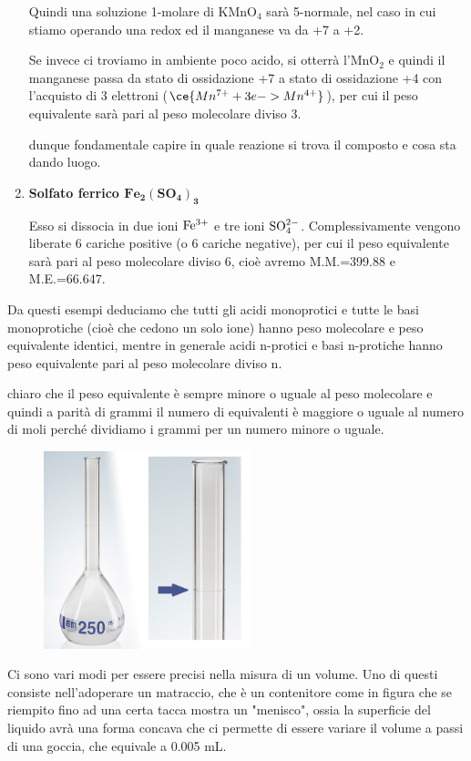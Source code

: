 \begin{enumerate}
    Quindi una soluzione 1-molare di KMnO$_4$ sarà 5-normale, nel caso in cui stiamo operando una redox ed il manganese va da +7 a +2. 
    
    \vspace{0.2cm}Se invece ci troviamo in ambiente poco acido, si otterrà l'MnO$_2$ e quindi il manganese passa da stato di ossidazione +7 a stato di ossidazione +4 con l'acquisto di 3 elettroni ($\ce{Mn^{7+} + 3e -> Mn^{4+}}$), per cui il peso equivalente sarà pari al peso molecolare diviso 3.

    \E dunque fondamentale capire in quale reazione si trova il composto e cosa sta dando luogo.

    \item \textbf{Solfato ferrico $\mathbf{Fe_2(SO_4)_3}$}

    Esso si dissocia in due ioni $\rm Fe^{3+}$ e tre ioni $\rm SO_4^{2-}$. Complessivamente vengono liberate 6 cariche positive (o 6 cariche negative), per cui il peso equivalente sarà pari al peso molecolare diviso 6, cioè avremo M.M.=399.88 e M.E.=66.647.
\end{enumerate}

Da questi esempi deduciamo che tutti gli acidi monoprotici e tutte le basi monoprotiche (cioè che cedono un solo ione) hanno peso molecolare e peso equivalente identici, mentre in generale acidi n-protici e basi n-protiche hanno peso equivalente pari al peso molecolare diviso n.

\E chiaro che il peso equivalente è sempre minore o uguale al peso molecolare e quindi a parità di grammi il numero di equivalenti è maggiore o uguale al numero di moli perché dividiamo i grammi per un numero minore o uguale.

\hspace{1cm}\begin{minipage}{0.42\textwidth}
    \begin{figure}[H]
        \includegraphics[width=6cm]{immagini/matraccio.png}
    \end{figure}
\end{minipage}
\begin{minipage}{0.5\textwidth}
    Ci sono vari modi per essere precisi nella misura di un volume. Uno di questi consiste nell'adoperare un matraccio, che è un contenitore come in figura che se riempito fino ad una certa tacca mostra un "menisco", ossia la superficie del liquido avrà una forma concava che ci permette di essere variare il volume a passi di una goccia, che equivale a 0.005 mL.
\end{minipage}

